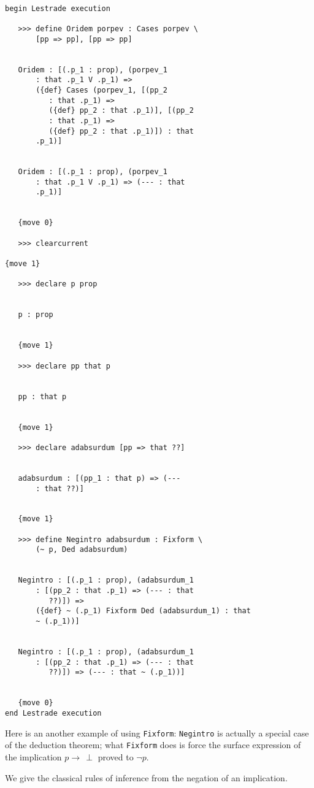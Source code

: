 \documentclass[12pt]{article}
\begin{document}
\begin{verbatim}

begin Lestrade execution

   >>> define Oridem porpev : Cases porpev \
       [pp => pp], [pp => pp]


   Oridem : [(.p_1 : prop), (porpev_1 
       : that .p_1 V .p_1) => 
       ({def} Cases (porpev_1, [(pp_2 
          : that .p_1) => 
          ({def} pp_2 : that .p_1)], [(pp_2 
          : that .p_1) => 
          ({def} pp_2 : that .p_1)]) : that 
       .p_1)]


   Oridem : [(.p_1 : prop), (porpev_1 
       : that .p_1 V .p_1) => (--- : that 
       .p_1)]


   {move 0}

   >>> clearcurrent

{move 1}

   >>> declare p prop


   p : prop


   {move 1}

   >>> declare pp that p


   pp : that p


   {move 1}

   >>> declare adabsurdum [pp => that ??]


   adabsurdum : [(pp_1 : that p) => (--- 
       : that ??)]


   {move 1}

   >>> define Negintro adabsurdum : Fixform \
       (~ p, Ded adabsurdum)


   Negintro : [(.p_1 : prop), (adabsurdum_1 
       : [(pp_2 : that .p_1) => (--- : that 
          ??)]) => 
       ({def} ~ (.p_1) Fixform Ded (adabsurdum_1) : that 
       ~ (.p_1))]


   Negintro : [(.p_1 : prop), (adabsurdum_1 
       : [(pp_2 : that .p_1) => (--- : that 
          ??)]) => (--- : that ~ (.p_1))]


   {move 0}
end Lestrade execution
\end{verbatim}


Here is an another example of using {\tt Fixform}:  {\tt Negintro} is actually a special case of the deduction theorem;  what {\tt Fixform} does is force the surface expression of the implication
$p \rightarrow \, \perp$ proved to $\neg p$.

We give the classical rules of inference from the negation of an implication.
\end{document}
